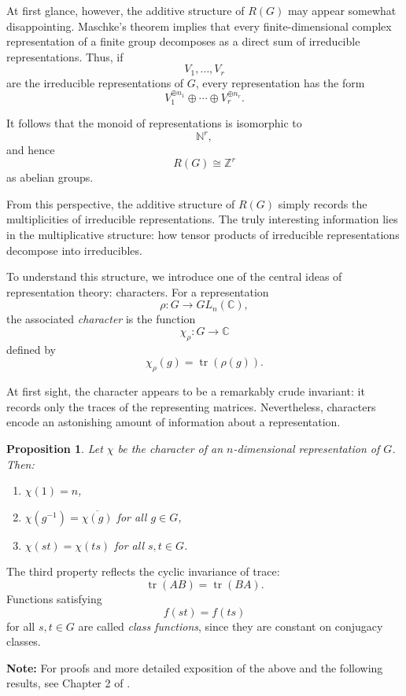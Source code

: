 \documentclass[12pt,reqno]{amsart}
\theoremstyle{plain}
\newtheorem{prop}[thm]{Proposition}
\numberwithin{equation}{section}
\begin{document}
At first glance, however, the additive structure of $R(G)$ may appear somewhat disappointing. Maschke's theorem implies that every finite-dimensional complex representation of a finite group decomposes as a direct sum of irreducible representations. Thus, if
\[
V_1,\dots,V_r
\]
are the irreducible representations of $G$, every representation has the form
\[
V_1^{\oplus n_1}\oplus \cdots \oplus V_r^{\oplus n_r}.
\]

It follows that the monoid of representations is isomorphic to
\[
\mathbb N^r,
\]
and hence
\[
R(G)\cong \mathbb Z^r
\]
as abelian groups.

From this perspective, the additive structure of $R(G)$ simply records the multiplicities of irreducible representations. The truly interesting information lies in the multiplicative structure: how tensor products of irreducible representations decompose into irreducibles.

To understand this structure, we introduce one of the central ideas of representation theory: characters.
For a representation
\[
\rho:G\to GL_n(\mathbb C),
\]
the associated \emph{character} is the function
\[
\chi_\rho:G\to \mathbb C
\]
defined by
\[
\chi_\rho(g)=\operatorname{tr}(\rho(g)).
\]

At first sight, the character appears to be a remarkably crude invariant: it records only the traces of the representing matrices. Nevertheless, characters encode an astonishing amount of information about a representation.

\begin{prop}\label{prop: characters}
Let $\chi$ be the character of an $n$-dimensional representation of $G$. Then:
\begin{enumerate}[label=$(\arabic*)$]
    \item $\chi(1)=n$,
    \item $\chi(g^{-1})=\overline{\chi(g)}$ for all $g\in G$,
    \item $\chi(st)=\chi(ts)$ for all $s,t\in G$.
\end{enumerate}
\end{prop}

The third property reflects the cyclic invariance of trace:
\[
\operatorname{tr}(AB)=\operatorname{tr}(BA).
\]
Functions satisfying
\[
f(st)=f(ts)
\]
for all $s,t\in G$ are called \emph{class functions}, since they are constant on conjugacy classes.

\medskip
{\bf Note:} For proofs and more detailed exposition of the above and the following results, see Chapter 2 of \cite{serre1977representations}.
\end{document}
